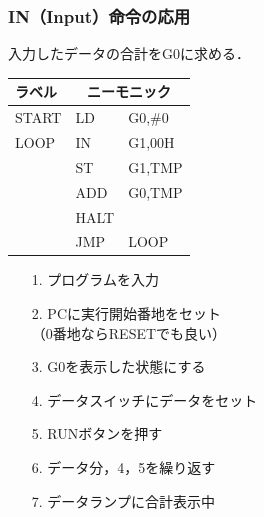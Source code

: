 \documentclass{beamer}                 %
\begin{document}
\begin{frame}
  \frametitle{IN（Input）命令の応用}
  入力したデータの合計をG0に求める．
  \vfill
  \begin{minipage}{0.43\columnwidth}
    {\ttfamily\small\begin{center}
      \begin{tabular}{|l|l l|}
        \hline
        ラベル & \multicolumn{2}{|c|}{ニーモニック} \\
        \hline
        START & LD   & G0,\#0        \\
        LOOP  & IN   & G1,00H        \\
              & ST   & G1,TMP        \\
              & ADD  & G0,TMP        \\
              & HALT &               \\
              & JMP  & LOOP          \\
        \hline
      \end{tabular}
    \end{center}}
  \end{minipage}
  \begin{minipage}{0.53\columnwidth}
    \begin{enumerate}
    \item[1.] プログラムを入力
    \item[2.] PCに実行開始番地をセット \\
      （0番地ならRESETでも良い）
    \item[3.] G0を表示した状態にする
    \item[4.] データスイッチにデータをセット
    \item[5.] RUNボタンを押す
    \item[6.] データ分，4，5を繰り返す
    \item[7.] データランプに合計表示中
    \end{enumerate}
  \end{minipage}
  \vfill
\end{frame}
\end{document}
